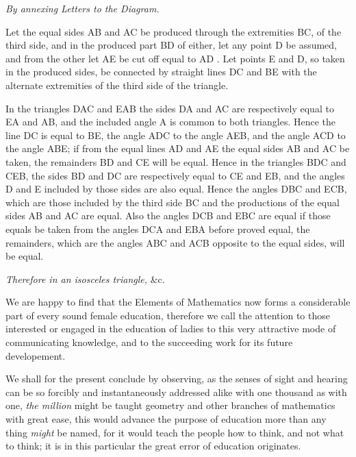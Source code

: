 \documentclass{byrnebook}
\begin{document}
\qedNB

\begin{center}
\emph{By annexing Letters to the Diagram.}
\end{center}

Let the equal sides AB and AC be produced through the extremities BC, of the third side, and in the produced part BD of either, let any point D be assumed, and from the other let AE be cut off equal to AD . Let points E and D, so taken in the produced sides, be connected by straight lines DC and BE with the alternate extremities of the third side of the triangle.

In the triangles DAC and EAB the sides DA and AC are respectively equal to EA and AB, and the included angle A is common to both triangles. Hence  the line DC is equal to BE, the angle ADC to the angle AEB, and the angle ACD to the angle ABE; if from the equal lines AD and AE the equal sides AB and AC be taken, the remainders BD and CE will be equal. Hence in the triangles BDC and CEB, the sides BD and DC are respectively equal to CE and EB, and the angles D and E included by those sides are also equal. Hence  the angles DBC and ECB, which are those included by the third side BC and the productions of the equal sides AB and AC are equal. Also the angles DCB and EBC are equal if those equals be taken from the angles DCA and EBA before proved equal, the remainders, which are the angles ABC and ACB opposite to the equal sides, will be equal.

\emph{Therefore in an isosceles triangle,} \&c.

\qedNB


We are happy to find that the Elements of Mathematics now forms a considerable part of every sound female education, therefore we call the attention to those interested or engaged in the education of ladies to this very attractive mode of communicating knowledge, and to the succeeding work for its future developement.

We shall for the present conclude by observing, as the senses of sight and hearing can be so forcibly and instantaneously addressed alike with one thousand as with one, \emph{the million} might be taught geometry and other branches of mathematics with great ease, this would advance the purpose of education more than any thing \emph{might} be named, for it would teach the people how to think, and not what to think; it is in this particular the great error of education originates.
\end{document}
